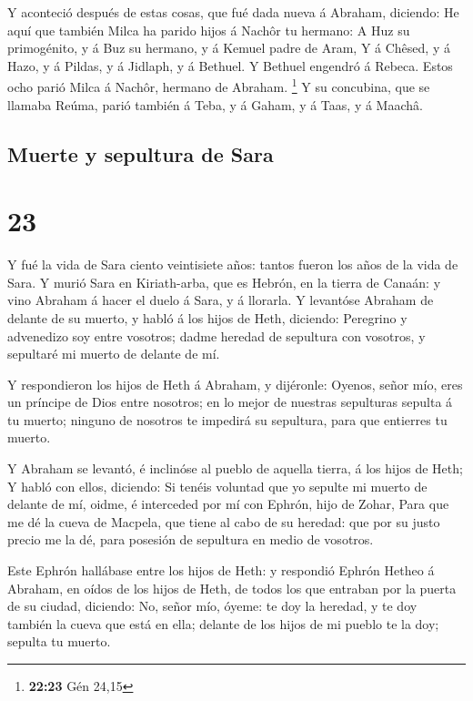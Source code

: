  Y aconteció después de estas cosas, que fué dada nueva á
Abraham, diciendo: He aquí que también Milca ha parido hijos á Nachôr tu
hermano:  A Huz su primogénito, y á Buz su hermano, y á
Kemuel padre de Aram,  Y á Chêsed, y á Hazo, y á Pildas, y
á Jidlaph, y á Bethuel.  Y Bethuel engendró á Rebeca. Estos
ocho parió Milca á Nachôr, hermano de Abraham. \footnote{\textbf{22:23}
  Gén 24,15}  Y su concubina, que se llamaba Reúma, parió
también á Teba, y á Gaham, y á Taas, y á Maachâ.

\hypertarget{muerte-y-sepultura-de-sara}{%
\subsection{Muerte y sepultura de
Sara}\label{muerte-y-sepultura-de-sara}}

\hypertarget{section-22}{%
\section{23}\label{section-22}}

 Y fué la vida de Sara ciento veintisiete años: tantos
fueron los años de la vida de Sara.  Y murió Sara en
Kiriath-arba, que es Hebrón, en la tierra de Canaán: y vino Abraham á
hacer el duelo á Sara, y á llorarla.  Y levantóse Abraham de
delante de su muerto, y habló á los hijos de Heth, diciendo:
 Peregrino y advenedizo soy entre vosotros; dadme heredad de
sepultura con vosotros, y sepultaré mi muerto de delante de mí.

 Y respondieron los hijos de Heth á Abraham, y dijéronle:
 Oyenos, señor mío, eres un príncipe de Dios entre nosotros;
en lo mejor de nuestras sepulturas sepulta á tu muerto; ninguno de
nosotros te impedirá su sepultura, para que entierres tu muerto.

 Y Abraham se levantó, é inclinóse al pueblo de aquella
tierra, á los hijos de Heth;  Y habló con ellos, diciendo:
Si tenéis voluntad que yo sepulte mi muerto de delante de mí, oidme, é
interceded por mí con Ephrón, hijo de Zohar,  Para que me dé
la cueva de Macpela, que tiene al cabo de su heredad: que por su justo
precio me la dé, para posesión de sepultura en medio de vosotros.

 Este Ephrón hallábase entre los hijos de Heth: y respondió
Ephrón Hetheo á Abraham, en oídos de los hijos de Heth, de todos los que
entraban por la puerta de su ciudad, diciendo:  No, señor
mío, óyeme: te doy la heredad, y te doy también la cueva que está en
ella; delante de los hijos de mi pueblo te la doy; sepulta tu muerto.

